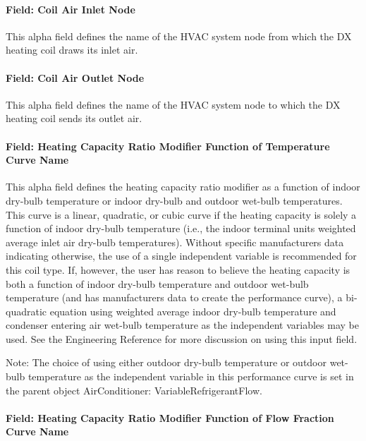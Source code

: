 \paragraph{Field: Coil Air Inlet Node}\label{field-coil-air-inlet-node}

This alpha field defines the name of the HVAC system node from which the DX heating coil draws its inlet air.

\paragraph{Field: Coil Air Outlet Node}\label{field-coil-air-outlet-node}

This alpha field defines the name of the HVAC system node to which the DX heating coil sends its outlet air.

\paragraph{Field: Heating Capacity Ratio Modifier Function of Temperature Curve Name}\label{field-heating-capacity-ratio-modifier-function-of-temperature-curve-name}

This alpha field defines the heating capacity ratio modifier as a function of indoor dry-bulb temperature or indoor dry-bulb and outdoor wet-bulb temperatures. This curve is a linear, quadratic, or cubic curve if the heating capacity is solely a function of indoor dry-bulb temperature (i.e., the indoor terminal units weighted average inlet air dry-bulb temperatures). Without specific manufacturers data indicating otherwise, the use of a single independent variable is recommended for this coil type. If, however, the user has reason to believe the heating capacity is both a function of indoor dry-bulb temperature and outdoor wet-bulb temperature (and has manufacturers data to create the performance curve), a bi-quadratic equation using weighted average indoor dry-bulb temperature and condenser entering air wet-bulb temperature as the independent variables may be used. See the Engineering Reference for more discussion on using this input field.

Note: The choice of using either outdoor dry-bulb temperature or outdoor wet-bulb temperature as the independent variable in this performance curve is set in the parent object AirConditioner: VariableRefrigerantFlow.

\paragraph{Field: Heating Capacity Ratio Modifier Function of Flow Fraction Curve Name}\label{field-heating-capacity-ratio-modifier-function-of-flow-fraction-curve-name}

